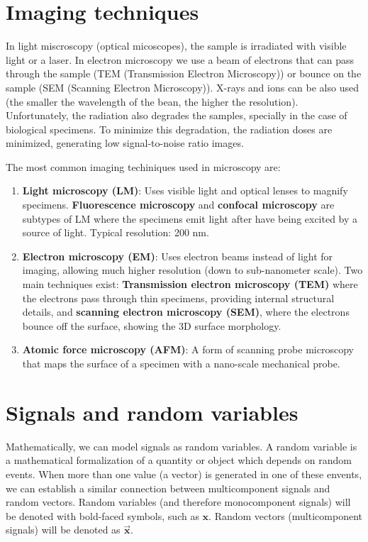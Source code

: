\documentclass{article}
\begin{document}

\section{Imaging techniques}

In light miscroscopy (optical
  micoscopes), the sample is irradiated with visible light or a
  laser. In electron microscopy we use a beam of electrons that can
  pass through the sample (TEM (Transmission Electron Microscopy)) or
  bounce on the sample (SEM (Scanning Electron Microscopy)). X-rays
  and ions can be also used (the smaller the wavelength of the bean,
  the higher the resolution). Unfortunately, the radiation also
  degrades the samples, specially in the case of biological
  specimens. To minimize this degradation, the radiation doses are
  minimized, generating low signal-to-noise ratio images.

The most common imaging techiniques used in microscopy are:

\begin{enumerate}
\item \textbf{Light microscopy (LM)}: Uses visible light and optical
  lenses to magnify specimens. \textbf{Fluorescence microscopy} and
  \textbf{confocal microscopy} are subtypes of LM where the specimens emit
  light after have being excited by a source of light. Typical
  resolution: 200 nm.
\item \textbf {Electron microscopy (EM)}: Uses electron beams instead
  of light for imaging, allowing much higher resolution (down to
  sub-nanometer scale). Two main techniques exist:
  \textbf{Transmission electron microscopy (TEM)} where the electrons
  pass through thin specimens, providing internal structural details,
  and \textbf{scanning electron microscopy (SEM)}, where the electrons
  bounce off the surface, showing the 3D surface morphology.
\item \textbf{Atomic force microscopy (AFM)}: A form of scanning probe
  microscopy that maps the surface of a specimen with a nano-scale
  mechanical probe.
\end{enumerate}


\section{Signals and random variables}
Mathematically, we can model signals as random variables. A random
variable is a mathematical formalization of a quantity or object which
depends on random events. When more than one value (a vector) is
generated in one of these envents, we can establish a similar
connection between multicomponent signals and random vectors. Random
variables (and therefore monocomponent signals) will be denoted with
bold-faced symbols, such as $\mathbf{x}$. Random vectors
(multicomponent signals) will be denoted as
$\overrightarrow{\mathbf{x}}$.
\end{document}
